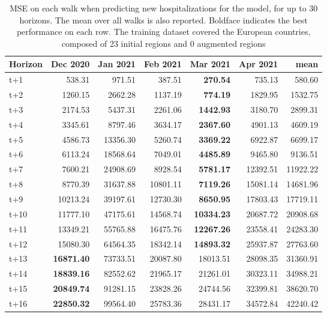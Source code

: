 \begin{table}[H]
\centering
\caption{MSE on each walk when predicting new hospitalizations for the model, for up to 30 horizons. The mean over all walks is also reported. Boldface indicates the best performance on each row. The training dataset covered the European countries, composed of 23 initial regions and 0 augmented regions }
\label{tab:MSE_walk_baseline}
\begin{tabular}{lrrrrrr}
\toprule
Horizon &  Dec 2020 &  Jan 2021 &  Feb 2021 &  Mar 2021 &  Apr 2021 &     mean \\
\midrule
t+1  & 538.31  & 971.51  & 387.51  & \textbf{270.54}  & 735.13  & 580.60  \\
t+2  & 1260.15  & 2662.28  & 1137.19  & \textbf{774.19}  & 1829.95  & 1532.75  \\
t+3  & 2174.53  & 5437.31  & 2261.06  & \textbf{1442.93}  & 3180.70  & 2899.31  \\
t+4  & 3345.61  & 8797.46  & 3634.17  & \textbf{2367.60}  & 4901.13  & 4609.19  \\
t+5  & 4586.73  & 13356.30  & 5260.74  & \textbf{3369.22}  & 6922.87  & 6699.17  \\
t+6  & 6113.24  & 18568.64  & 7049.01  & \textbf{4485.89}  & 9465.80  & 9136.51  \\
t+7  & 7600.21  & 24908.69  & 8928.54  & \textbf{5781.17}  & 12392.51  & 11922.22  \\
t+8  & 8770.39  & 31637.88  & 10801.11  & \textbf{7119.26}  & 15081.14  & 14681.96  \\
t+9  & 10213.24  & 39197.61  & 12730.30  & \textbf{8650.95}  & 17803.43  & 17719.11  \\
t+10  & 11777.10  & 47175.61  & 14568.74  & \textbf{10334.23}  & 20687.72  & 20908.68  \\
t+11  & 13349.21  & 55765.88  & 16475.76  & \textbf{12267.26}  & 23558.41  & 24283.30  \\
t+12  & 15080.30  & 64564.35  & 18342.14  & \textbf{14893.32}  & 25937.87  & 27763.60  \\
t+13  & \textbf{16871.40}  & 73733.51  & 20087.80  & 18013.51  & 28098.35  & 31360.91  \\
t+14  & \textbf{18839.16}  & 82552.62  & 21965.17  & 21261.01  & 30323.11  & 34988.21  \\
t+15  & \textbf{20849.74}  & 91281.15  & 23828.26  & 24744.56  & 32399.81  & 38620.70  \\
t+16  & \textbf{22850.32}  & 99564.40  & 25783.36  & 28431.17  & 34572.84  & 42240.42  \\

\end{tabular}
\end{table}
